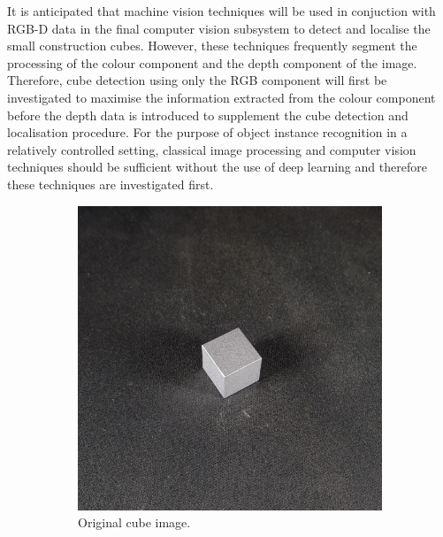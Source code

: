 It is anticipated that machine vision techniques will be used in conjuction with RGB-D data in the final computer vision subsystem to detect and localise the small construction cubes. However, these techniques frequently segment the processing of the colour component and the depth component of the image. Therefore, cube detection using only the RGB component will first be investigated to maximise the information extracted from the colour component before the depth data is introduced to supplement the cube detection and localisation procedure. For the purpose of object instance recognition in a relatively controlled setting, classical image processing and computer vision techniques should be sufficient without the use of deep learning and therefore these techniques are investigated first.

\begin{figure}[H]
    \centering
    \begin{subfigure}[b]{0.49\textwidth}
         \includegraphics[width=\textwidth]{figures/202105/original-cube.png}
         \caption{Original cube image.}
         \label{fig:original-cube-image}
    \end{subfigure}
    \begin{subfigure}[b]{0.49\textwidth}

\end{subfigure}
\end{figure}
